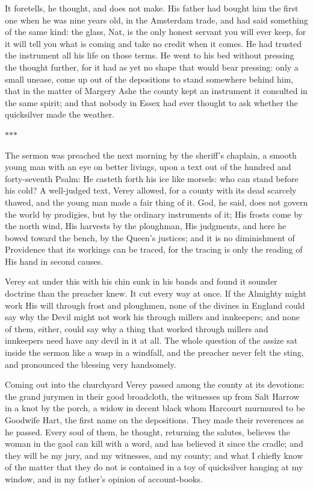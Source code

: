 \documentclass[11pt]{article}
\newcommand{\scenebreak}{%
  \par\vspace{1.1\baselineskip}%
  {\centering $\ast$\quad$\ast$\quad$\ast$\par}%
  \vspace{1.1\baselineskip}\noindent}
\begin{document}
It foretells, he thought, and does not make. His father had bought him the first one when he was nine years old, in the Amsterdam trade, and had said something of the same kind: the glass, Nat, is the only honest servant you will ever keep, for it will tell you what is coming and take no credit when it comes. He had trusted the instrument all his life on those terms. He went to his bed without pressing the thought further, for it had as yet no shape that would bear pressing: only a small unease, come up out of the depositions to stand somewhere behind him, that in the matter of Margery Ashe the county kept an instrument it consulted in the same spirit; and that nobody in Essex had ever thought to ask whether the quicksilver made the weather.

\scenebreak
\noindent The sermon was preached the next morning by the sheriff's chaplain, a smooth young man with an eye on better livings, upon a text out of the hundred and forty-seventh Psalm: He casteth forth his ice like morsels: who can stand before his cold? A well-judged text, Verey allowed, for a county with its dead scarcely thawed, and the young man made a fair thing of it. God, he said, does not govern the world by prodigies, but by the ordinary instruments of it; His frosts come by the north wind, His harvests by the ploughman, His judgments, and here he bowed toward the bench, by the Queen's justices; and it is no diminishment of Providence that its workings can be traced, for the tracing is only the reading of His hand in second causes.

Verey sat under this with his chin sunk in his bands and found it sounder doctrine than the preacher knew. It cut every way at once. If the Almighty might work His will through frost and ploughmen, none of the divines in England could say why the Devil might not work his through millers and innkeepers; and none of them, either, could say why a thing that worked through millers and innkeepers need have any devil in it at all. The whole question of the assize sat inside the sermon like a wasp in a windfall, and the preacher never felt the sting, and pronounced the blessing very handsomely.

Coming out into the churchyard Verey passed among the county at its devotions: the grand jurymen in their good broadcloth, the witnesses up from Salt Harrow in a knot by the porch, a widow in decent black whom Harcourt murmured to be Goodwife Hart, the first name on the depositions. They made their reverences as he passed. Every soul of them, he thought, returning the salutes, believes the woman in the gaol can kill with a word, and has believed it since the cradle; and they will be my jury, and my witnesses, and my county; and what I chiefly know of the matter that they do not is contained in a toy of quicksilver hanging at my window, and in my father's opinion of account-books.
\end{document}
